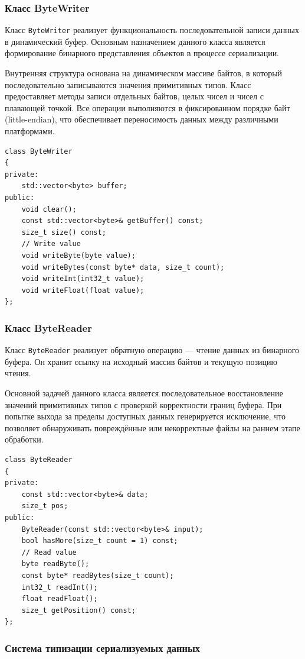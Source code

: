 \documentclass[coursework]{SCWorks}
\begin{document}
\subsubsection{Класс ByteWriter}

Класс \texttt{ByteWriter} реализует функциональность последовательной записи данных в динамический буфер. Основным назначением данного класса является формирование бинарного представления объектов в процессе сериализации.

Внутренняя структура основана на динамическом массиве байтов, в который последовательно записываются значения примитивных типов. Класс предоставляет методы записи отдельных байтов, целых чисел и чисел с плавающей точкой. Все операции выполняются в фиксированном порядке байт (little-endian), что обеспечивает переносимость данных между различными платформами.
\begin{verbatim}
class ByteWriter
{
private:
	std::vector<byte> buffer;
public:
	void clear();
	const std::vector<byte>& getBuffer() const;
	size_t size() const;
	// Write value
	void writeByte(byte value);
	void writeBytes(const byte* data, size_t count);
	void writeInt(int32_t value);
	void writeFloat(float value);
};
\end{verbatim}

\subsubsection{Класс ByteReader}

Класс \texttt{ByteReader} реализует обратную операцию — чтение данных из бинарного буфера. Он хранит ссылку на исходный массив байтов и текущую позицию чтения.

Основной задачей данного класса является последовательное восстановление значений примитивных типов с проверкой корректности границ буфера. При попытке выхода за пределы доступных данных генерируется исключение, что позволяет обнаруживать повреждённые или некорректные файлы на раннем этапе обработки.
\begin{verbatim}
class ByteReader
{
private:
	const std::vector<byte>& data;
	size_t pos;
public:
	ByteReader(const std::vector<byte>& input);
	bool hasMore(size_t count = 1) const;
    // Read value
	byte readByte();
	const byte* readBytes(size_t count);
	int32_t readInt();
	float readFloat();
	size_t getPosition() const;
};
\end{verbatim}

\subsubsection{Система типизации сериализуемых данных}
\end{document}
